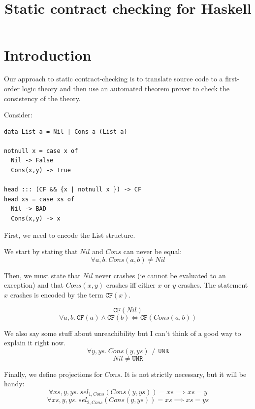 \documentclass[preprint]{sigplanconf}
\begin{document}
\newcommand{\etrans}[1]{\mathcal{E} \llbracket #1 \rrbracket}
\newcommand{\dtrans}[1]{\mathcal{D} \llbracket #1 \rrbracket}
\newcommand{\ttrans}[1]{\mathcal{T} \llbracket #1 \rrbracket}
\newcommand{\strans}[1]{\mathcal{S} \llbracket #1 \rrbracket}
\newcommand{\trans}[1]{\llbracket #1 \rrbracket}

\newcommand{\unr}{\texttt{UNR}}
\newcommand{\bad}{\texttt{BAD}}
\newcommand{\any}{\texttt{Any}}
\newcommand{\ok}{\texttt{Ok}}
\newcommand{\hprime}{\mathcal{H}'}
\newcommand{\cf}[1]{\texttt{CF}(#1)}
\newcommand{\cfc}{\texttt{CF}}

\title{Static contract checking for Haskell}
\maketitle

\section{Introduction}

Our approach to static contract-checking is to translate source code
to a first-order logic theory and then use an automated theorem prover
to check the consistency of the theory.

Consider:
\begin{verbatim}
data List a = Nil | Cons a (List a)

notnull x = case x of
  Nil -> False
  Cons(x,y) -> True

head ::: (CF && {x | notnull x }) -> CF
head xs = case xs of
  Nil -> BAD
  Cons(x,y) -> x
\end{verbatim}

First, we need to encode the List structure. 

We start by stating that $Nil$ and $Cons$ can never be equal:
$$\forall a,b.~Cons(a,b) \neq Nil$$

Then, we must state that $Nil$ never crashes (ie cannot be evaluated
to an exception) and that $Cons(x,y)$ crashes iff either $x$ or $y$
crashes. The statement $x$ crashes is encoded by the term $\cf{x}$.

$$\cf{Nil}$$
$$\forall a,b.~\cf{a} \land \cf{b} \iff \cf{Cons(a,b)}$$

We also say some stuff about unreachibility but I can't think of a
good way to explain it right now.
$$\forall y,ys.~Cons(y,ys) \neq \unr $$
$$Nil \neq \unr $$

Finally, we define projections for $Cons$. It is not strictly
necessary, but it will be handy:
$$\forall xs,y,ys.~sel_{1,Cons}(Cons(y,ys)) = xs \implies xs = y $$
$$\forall xs,y,ys.~sel_{2,Cons}(Cons(y,ys)) = xs \implies xs = ys $$
\end{document}
